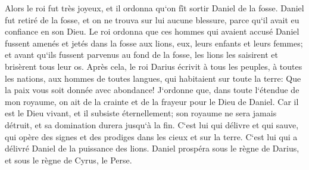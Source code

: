 \verse Alors le roi fut très joyeux, et il ordonna qu`on fît sortir Daniel de la fosse. Daniel fut retiré de la fosse, et on ne trouva sur lui aucune blessure, parce qu`il avait eu confiance en son Dieu. 
\verse Le roi ordonna que ces hommes qui avaient accusé Daniel fussent amenés et jetés dans la fosse aux lions, eux, leurs enfants et leurs femmes; et avant qu`ils fussent parvenus au fond de la fosse, les lions les saisirent et brisèrent tous leur os. 
\verse Après cela, le roi Darius écrivit à tous les peuples, à toutes les nations, aux hommes de toutes langues, qui habitaient sur toute la terre: Que la paix vous soit donnée avec abondance! 
\verse J`ordonne que, dans toute l`étendue de mon royaume, on ait de la crainte et de la frayeur pour le Dieu de Daniel. Car il est le Dieu vivant, et il subsiste éternellement; son royaume ne sera jamais détruit, et sa domination durera jusqu`à la fin. 
\verse C`est lui qui délivre et qui sauve, qui opère des signes et des prodiges dans les cieux et sur la terre. C`est lui qui a délivré Daniel de la puissance des lions. 
\verse Daniel prospéra sous le règne de Darius, et sous le règne de Cyrus, le Perse. 

